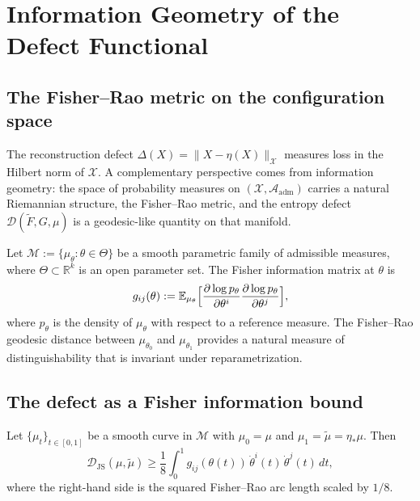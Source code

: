\documentclass[12pt, oneside]{memoir}
\newcommand{\X}{\mathcal{X}}
\newcommand{\Ft}{\widetilde{F}}
\newcommand{\Aadm}{\mathcal{A}_{\mathrm{adm}}}
\newcommand{\Djs}{\mathcal{D}_{\mathrm{JS}}}
\newcommand{\nnorm}[1]{\lVert #1 \rVert}
\begin{document}
\chapter{Information Geometry of the Defect Functional}
\label{ch:infogeo}

\section{The Fisher--Rao metric on the configuration space}

The reconstruction defect $\Delta(X) = \nnorm{X - \eta(X)}_\X$ measures loss in the
Hilbert norm of $\X$.  A complementary perspective comes from information geometry: the
space of probability measures on $(\X, \Aadm)$ carries a natural Riemannian structure,
the Fisher--Rao metric, and the entropy defect $\mathcal{D}(\Ft, G, \mu)$ is a
geodesic-like quantity on that manifold.

Let $\mathcal{M} := \{\mu_\theta : \theta \in \Theta\}$ be a smooth parametric family
of admissible measures, where $\Theta \subset \mathbb{R}^k$ is an open parameter set.
The Fisher information matrix at $\theta$ is
\begin{equation}
  g_{ij}(\theta) := \mathbb{E}_{\mu_\theta}
    \Bigl[\frac{\partial \log p_\theta}{\partial \theta^i}
          \frac{\partial \log p_\theta}{\partial \theta^j}\Bigr],
\end{equation}
where $p_\theta$ is the density of $\mu_\theta$ with respect to a reference measure.
The Fisher--Rao geodesic distance between $\mu_{\theta_0}$ and $\mu_{\theta_1}$ provides
a natural measure of distinguishability that is invariant under reparametrization.

\section{The defect as a Fisher information bound}

\begin{proposition}
\label{prop:fisher}
Let $\{\mu_t\}_{t \in [0,1]}$ be a smooth curve in $\mathcal{M}$ with $\mu_0 = \mu$
and $\mu_1 = \tilde\mu = \eta_*\mu$.  Then
\begin{equation}
  \Djs(\mu, \tilde\mu) \ge \frac{1}{8} \int_0^1
    g_{ij}(\theta(t))\, \dot\theta^i(t)\, \dot\theta^j(t)\, dt,
\end{equation}
where the right-hand side is the squared Fisher--Rao arc length scaled by $1/8$.
\end{proposition}
\end{document}
